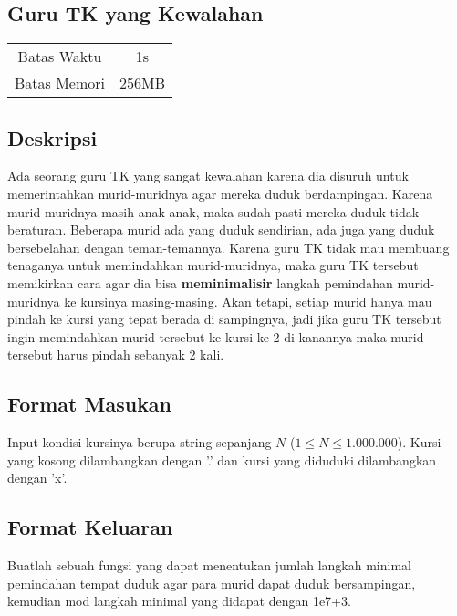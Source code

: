 \documentclass{article}
\begin{document}
\begin{center}

    
    \section*{Guru TK yang Kewalahan} %

    \begin{tabular}{ | c c | }
        \hline
        Batas Waktu  & 1s \\    %
        Batas Memori & 256MB \\  %
        \hline
    \end{tabular}
\end{center}

\subsection*{Deskripsi}
Ada seorang guru TK yang sangat kewalahan karena dia disuruh untuk memerintahkan murid-muridnya agar mereka duduk berdampingan. Karena murid-muridnya masih anak-anak, maka sudah pasti mereka duduk tidak beraturan. Beberapa murid ada yang duduk sendirian, ada juga yang duduk bersebelahan dengan teman-temannya. Karena guru TK tidak mau membuang tenaganya untuk memindahkan murid-muridnya, maka guru TK tersebut memikirkan cara agar dia bisa \textbf{meminimalisir} langkah pemindahan murid-muridnya ke kursinya masing-masing. Akan tetapi, setiap murid hanya mau pindah ke kursi yang tepat berada di sampingnya, jadi jika guru TK tersebut ingin memindahkan murid tersebut ke kursi ke-2 di kanannya maka murid tersebut harus pindah sebanyak 2 kali.

\subsection*{Format Masukan}
Input kondisi kursinya berupa string sepanjang $N$ ($1 \leq N \leq 1.000.000$). Kursi yang kosong dilambangkan dengan '.' dan kursi yang diduduki dilambangkan dengan 'x'.

\subsection*{Format Keluaran}
Buatlah sebuah fungsi yang dapat menentukan jumlah langkah minimal pemindahan tempat duduk agar para murid dapat duduk bersampingan, kemudian mod langkah minimal yang didapat dengan 1e7+3.
\\
\end{document}
